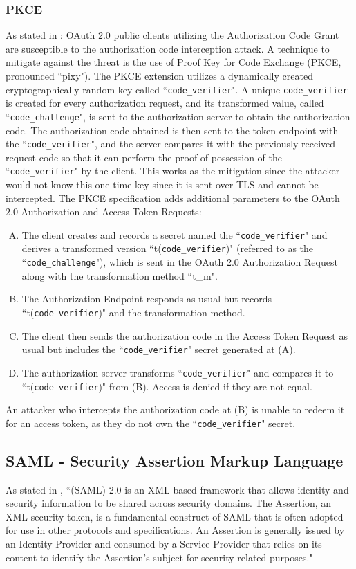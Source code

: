 \subsubsection{PKCE}
As stated in \cite{pkce_downgrade}: OAuth 2.0 public clients utilizing the Authorization Code Grant are susceptible to the authorization code interception attack. A technique to mitigate against the threat is the use of Proof Key for Code Exchange (PKCE, pronounced ``pixy"). The PKCE extension utilizes a dynamically created cryptographically random key called ``\texttt{code\_verifier}". A unique \texttt{code\_verifier} is created for every authorization request, and its transformed value, called ``\texttt{code\_challenge}", is sent to the authorization server to obtain the authorization code. The authorization code obtained is then sent to the token endpoint with the ``\texttt{code\_verifier}", and the server compares it with the previously received request code so that it can perform the proof of possession of the ``\texttt{code\_verifier}" by the client. This works as the mitigation since the attacker would not know this one-time key since it is sent over TLS and cannot be intercepted.
The PKCE specification adds additional parameters to the OAuth 2.0 Authorization and Access Token Requests:
\begin{enumerate}[(A)]
    \item The client creates and records a secret named the ``\texttt{code\_verifier}" and derives a transformed version ``t(\texttt{code\_verifier})" (referred to as the ``\texttt{code\_challenge}"), which is sent in the OAuth 2.0 Authorization Request along with the transformation method ``t\_m". 
    \item The Authorization Endpoint responds as usual but records ``t(\texttt{code\_verifier})" and the transformation method. 
    \item The client then sends the authorization code in the Access Token Request as usual but includes the ``\texttt{code\_verifier}" secret generated at (A). 
    \item The authorization server transforms ``\texttt{code\_verifier}" and compares it to ``t(\texttt{code\_verifier})" from (B).  Access is denied if they are not equal.
\end{enumerate}
An attacker who intercepts the authorization code at (B) is unable to redeem it for an access token, as they do not own the ``\texttt{code\_verifier}" secret.

\subsection{SAML - Security Assertion Markup Language}
As stated in \cite{ietf_SAML}, ``(\Gls{SAML}) 2.0 is an XML-based framework that allows identity and security information to be shared across security domains. The Assertion, an XML security token, is a fundamental construct of \Gls{SAML} that is often adopted for use in other protocols and specifications. An Assertion is generally issued by an Identity Provider and consumed by a Service Provider that relies on its content to identify the Assertion's subject for security-related purposes."





